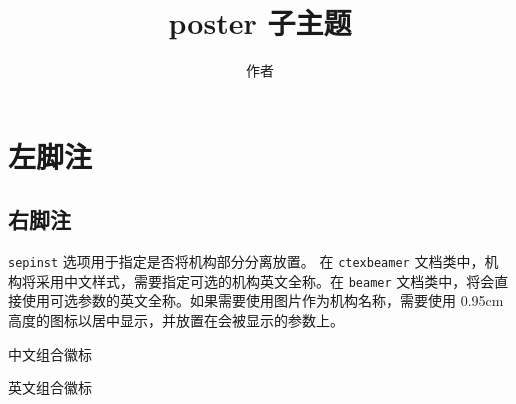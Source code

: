 \documentclass{ctexbeamer}
\begin{document}
    \title{poster 子主题}
    \author{作者}
    \section{左脚注}
    \subsection{右脚注}
    \begin{frame}[fragile]
        \texttt{sepinst} 选项用于指定是否将机构部分分离放置。
        在 \texttt{ctexbeamer} 文档类中，机构将采用中文样式，需要指定可选的机构英文全称。在 \texttt{beamer} 文档类中，将会直接使用可选参数的英文全称。如果需要使用图片作为机构名称，需要使用 0.95cm 高度的图标以居中显示，并放置在会被显示的参数上。
        
        \begin{codeblock}[]{中文组合徽标}
\institute[]{\resizebox{!}{0.95cm}{\zhlogo}}
        \end{codeblock}

        \secondaryinstlogo[]{\resizebox{!}{0.95cm}{\zhlogo}}{\sjtubadge}
        
        \begin{codeblock}[]{英文组合徽标}
\institute[\resizebox{!}{0.95cm}{\enlogo}]{}
        \end{codeblock}

        \secondaryinstlogo{\resizebox{!}{0.95cm}{\enlogo}}{\sjtubadge}
    \end{frame}
\end{document}
